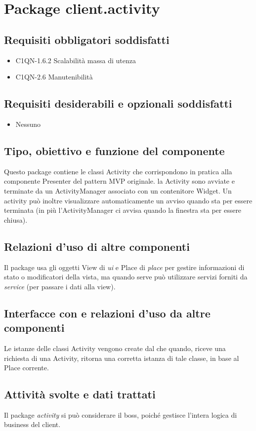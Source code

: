 \newpage
\section{Package client.activity} %
\subsection*{Requisiti obbligatori soddisfatti}
\begin{itemize}
	\item C1QN-1.6.2 Scalabilit\`a massa di utenza
	\item C1QN-2.6 Manutenibilit\`a
\end{itemize}
\subsection*{Requisiti desiderabili e opzionali soddisfatti}
\begin{itemize}
    \item Nessuno
\end{itemize}
\subsection*{Tipo, obiettivo e funzione del componente}
Questo package contiene le classi Activity che corrispondono in pratica alla
componente Presenter del pattern MVP originale. la Activity sono avviate e
terminate da un ActivityManager associato con un contenitore Widget. Un activity
pu\`o inoltre visualizzare automaticamente un avviso quando sta per essere
terminata (in pi\`u l'ActivityManager ci avvisa quando la finestra sta per
essere chiusa).
\subsection*{Relazioni d'uso di altre componenti} Il package usa gli oggetti
View di \emph{ui} e Place di \emph{place} per gestire informazioni di stato o
modificatori della vista, ma quando serve pu\`o utilizzare servizi forniti da
\emph{service} (per passare i dati alla view).
\subsection*{Interfacce con e relazioni d'uso da altre componenti} Le istanze
delle classi Activity vengono create dal  che quando,
riceve una richiesta di una Activity, ritorna una corretta istanza di tale
classe, in base al Place corrente.
\subsection*{Attivit\`a svolte e dati trattati} Il package \emph{activity} si
pu\`o considerare il boss, poich\'e gestisce l'intera logica di business del
client.

